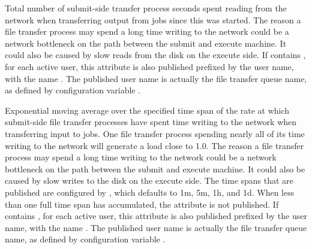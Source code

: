 \begin{description}
\item[\AdAttr{FileTransferNetReadSeconds}] Total number of submit-side
  transfer process seconds spent reading from the network when
  transferring output from jobs since this  was
  started.  The reason a file transfer process may
  spend a long time writing to the network could be a network
  bottleneck on the path between the submit and execute machine.  It
  could also be caused by slow reads from the disk on the execute side.
  If  contains ,
  for each active user, this attribute is also published prefixed by
  the user name, with the name
  .
  The published user name is actually the file transfer queue name, as
  defined by configuration variable .

\item[\AdAttr{FileTransferNetWriteLoad\_<timespan>}] Exponential
  moving average over the specified time span of the rate at which
  submit-side file transfer processes have spent time writing to the
  network when transferring input to jobs.  One file transfer process
  spending nearly all of its time writing to the network will generate
  a load close to 1.0.  The reason a file transfer process may spend
  a long time writing to the network could be a network bottleneck on
  the path between the submit and execute machine.  It could also be
  caused by slow writes to the disk on the execute side.
  The time spans that are published are configured by
  , which defaults to
  1m, 5m, 1h, and 1d.  When less than one full time span has
  accumulated, the attribute is not published.
  If  contains ,
  for each active user, this attribute is also published prefixed by
  the user name, with the name
  .
  The published user name is actually the file transfer queue name, as
  defined by configuration variable .


\end{description}
